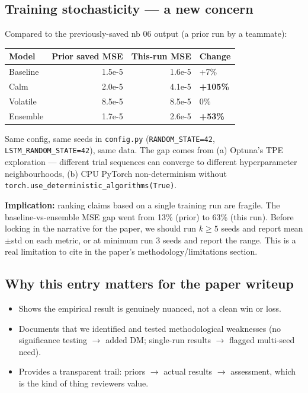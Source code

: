 \documentclass[11pt]{article}
\begin{document}
\subsection*{Training stochasticity --- a new concern}

Compared to the previously-saved nb 06 output (a prior run by a teammate):

\begin{center}
\begin{tabular}{lrrl}
\toprule
Model & Prior saved MSE & This-run MSE & Change \\
\midrule
Baseline & 1.5e-5 & 1.6e-5 & +7\% \\
Calm     & 2.0e-5 & 4.1e-5 & \textbf{+105\%} \\
Volatile & 8.5e-5 & 8.5e-5 & 0\% \\
Ensemble & 1.7e-5 & 2.6e-5 & \textbf{+53\%} \\
\bottomrule
\end{tabular}
\end{center}

Same config, same seeds in \texttt{config.py} (\texttt{RANDOM\_STATE=42}, \texttt{LSTM\_RANDOM\_STATE=42}), same data. The gap comes from (a) Optuna's TPE exploration --- different trial sequences can converge to different hyperparameter neighbourhoods, (b) CPU PyTorch non-determinism without \texttt{torch.use\_deterministic\_algorithms(True)}.

\textbf{Implication:} ranking claims based on a single training run are fragile. The baseline-vs-ensemble MSE gap went from 13\% (prior) to 63\% (this run). Before locking in the narrative for the paper, we should run $k \geq 5$ seeds and report mean$\pm$std on each metric, or at minimum run 3 seeds and report the range. This is a real limitation to cite in the paper's methodology/limitations section.

\subsection*{Why this entry matters for the paper writeup}

\begin{itemize}[leftmargin=*]
  \item Shows the empirical result is genuinely nuanced, not a clean win or loss.
  \item Documents that we identified and tested methodological weaknesses (no significance testing $\to$ added DM; single-run results $\to$ flagged multi-seed need).
  \item Provides a transparent trail: priors $\to$ actual results $\to$ assessment, which is the kind of thing reviewers value.
\end{itemize}
\end{document}
